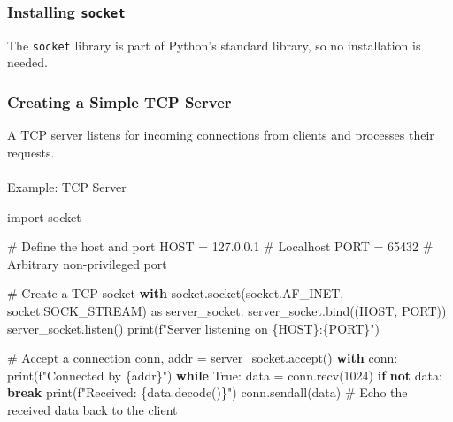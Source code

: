 \documentclass[
  letterpaper,
  DIV=11,
  numbers=noendperiod]{scrreprt}
\makeatletter
\let\oldparagraph\paragraph
\renewcommand{\paragraph}{
    \@ifstar
      \xxxParagraphStar
      \xxxParagraphNoStar
  }
\newcommand{\xxxParagraphStar}[1]{\oldparagraph*{#1}\mbox{}}
\newcommand{\xxxParagraphNoStar}[1]{\oldparagraph{#1}\mbox{}}
\newenvironment{Shaded}{\begin{snugshade}}{\end{snugshade}}
\newcommand{\BuiltInTok}[1]{\textcolor[rgb]{0.00,0.23,0.31}{#1}}
\newcommand{\CommentTok}[1]{\textcolor[rgb]{0.37,0.37,0.37}{#1}}
\newcommand{\ControlFlowTok}[1]{\textcolor[rgb]{0.00,0.23,0.31}{\textbf{#1}}}
\newcommand{\DecValTok}[1]{\textcolor[rgb]{0.68,0.00,0.00}{#1}}
\newcommand{\ImportTok}[1]{\textcolor[rgb]{0.00,0.46,0.62}{#1}}
\newcommand{\KeywordTok}[1]{\textcolor[rgb]{0.00,0.23,0.31}{\textbf{#1}}}
\newcommand{\NormalTok}[1]{\textcolor[rgb]{0.00,0.23,0.31}{#1}}
\newcommand{\OperatorTok}[1]{\textcolor[rgb]{0.37,0.37,0.37}{#1}}
\newcommand{\SpecialCharTok}[1]{\textcolor[rgb]{0.37,0.37,0.37}{#1}}
\newcommand{\SpecialStringTok}[1]{\textcolor[rgb]{0.13,0.47,0.30}{#1}}
\newcommand{\StringTok}[1]{\textcolor[rgb]{0.13,0.47,0.30}{#1}}
\newcommand{\VariableTok}[1]{\textcolor[rgb]{0.07,0.07,0.07}{#1}}
\makeatother
\begin{document}
\subsubsection{\texorpdfstring{Installing
\texttt{socket}}{Installing socket}}\label{installing-socket}

The \texttt{socket} library is part of Python's standard library, so no
installation is needed.

\subsubsection{Creating a Simple TCP
Server}\label{creating-a-simple-tcp-server}

A TCP server listens for incoming connections from clients and processes
their requests.

\paragraph{Example: TCP Server}\label{example-tcp-server}

\begin{Shaded}
\begin{Highlighting}[]
\ImportTok{import}\NormalTok{ socket}

\CommentTok{\# Define the host and port}
\NormalTok{HOST }\OperatorTok{=} \StringTok{\textquotesingle{}127.0.0.1\textquotesingle{}}  \CommentTok{\# Localhost}
\NormalTok{PORT }\OperatorTok{=} \DecValTok{65432}        \CommentTok{\# Arbitrary non{-}privileged port}

\CommentTok{\# Create a TCP socket}
\ControlFlowTok{with}\NormalTok{ socket.socket(socket.AF\_INET, socket.SOCK\_STREAM) }\ImportTok{as}\NormalTok{ server\_socket:}
\NormalTok{    server\_socket.bind((HOST, PORT))}
\NormalTok{    server\_socket.listen()}
    \BuiltInTok{print}\NormalTok{(}\SpecialStringTok{f"Server listening on }\SpecialCharTok{\{}\NormalTok{HOST}\SpecialCharTok{\}}\SpecialStringTok{:}\SpecialCharTok{\{}\NormalTok{PORT}\SpecialCharTok{\}}\SpecialStringTok{"}\NormalTok{)}

    \CommentTok{\# Accept a connection}
\NormalTok{    conn, addr }\OperatorTok{=}\NormalTok{ server\_socket.accept()}
    \ControlFlowTok{with}\NormalTok{ conn:}
        \BuiltInTok{print}\NormalTok{(}\SpecialStringTok{f"Connected by }\SpecialCharTok{\{}\NormalTok{addr}\SpecialCharTok{\}}\SpecialStringTok{"}\NormalTok{)}
        \ControlFlowTok{while} \VariableTok{True}\NormalTok{:}
\NormalTok{            data }\OperatorTok{=}\NormalTok{ conn.recv(}\DecValTok{1024}\NormalTok{)}
            \ControlFlowTok{if} \KeywordTok{not}\NormalTok{ data:}
                \ControlFlowTok{break}
            \BuiltInTok{print}\NormalTok{(}\SpecialStringTok{f"Received: }\SpecialCharTok{\{}\NormalTok{data}\SpecialCharTok{.}\NormalTok{decode()}\SpecialCharTok{\}}\SpecialStringTok{"}\NormalTok{)}
\NormalTok{            conn.sendall(data)  }\CommentTok{\# Echo the received data back to the client}
\end{Highlighting}
\end{Shaded}
\end{document}
